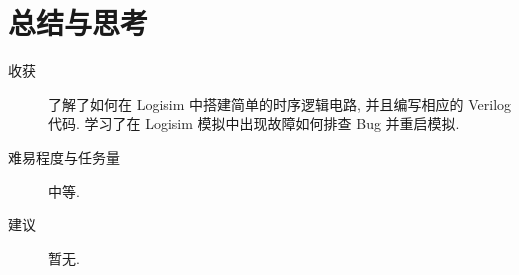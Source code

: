\documentclass[UTF8,fontset=fandol]{ctexart}
\begin{document}
\section*{总结与思考}
\begin{description}
  \item[收获] 了解了如何在 Logisim 中搭建简单的时序逻辑电路, 并且编写相应的 Verilog 代码. 学习了在 Logisim 模拟中出现故障如何排查 Bug 并重启模拟. 
  \item[难易程度与任务量] 中等.
  \item[建议] 暂无. 
\end{description}
\end{document}
